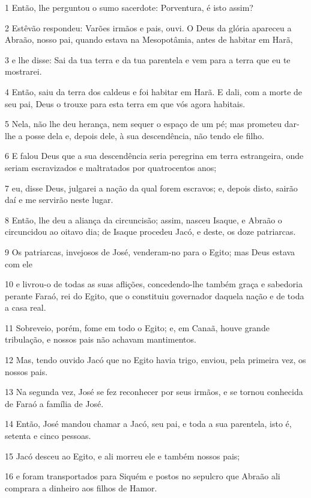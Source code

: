 \par 1 Então, lhe perguntou o sumo sacerdote: Porventura, é isto assim?
\par 2 Estêvão respondeu: Varões irmãos e pais, ouvi. O Deus da glória apareceu a Abraão, nosso pai, quando estava na Mesopotâmia, antes de habitar em Harã,
\par 3 e lhe disse: Sai da tua terra e da tua parentela e vem para a terra que eu te mostrarei.
\par 4 Então, saiu da terra dos caldeus e foi habitar em Harã. E dali, com a morte de seu pai, Deus o trouxe para esta terra em que vós agora habitais.
\par 5 Nela, não lhe deu herança, nem sequer o espaço de um pé; mas prometeu dar-lhe a posse dela e, depois dele, à sua descendência, não tendo ele filho.
\par 6 E falou Deus que a sua descendência seria peregrina em terra estrangeira, onde seriam escravizados e maltratados por quatrocentos anos;
\par 7 eu, disse Deus, julgarei a nação da qual forem escravos; e, depois disto, sairão daí e me servirão neste lugar.
\par 8 Então, lhe deu a aliança da circuncisão; assim, nasceu Isaque, e Abraão o circuncidou ao oitavo dia; de Isaque procedeu Jacó, e deste, os doze patriarcas.
\par 9 Os patriarcas, invejosos de José, venderam-no para o Egito; mas Deus estava com ele
\par 10 e livrou-o de todas as suas aflições, concedendo-lhe também graça e sabedoria perante Faraó, rei do Egito, que o constituiu governador daquela nação e de toda a casa real.
\par 11 Sobreveio, porém, fome em todo o Egito; e, em Canaã, houve grande tribulação, e nossos pais não achavam mantimentos.
\par 12 Mas, tendo ouvido Jacó que no Egito havia trigo, enviou, pela primeira vez, os nossos pais.
\par 13 Na segunda vez, José se fez reconhecer por seus irmãos, e se tornou conhecida de Faraó a família de José.
\par 14 Então, José mandou chamar a Jacó, seu pai, e toda a sua parentela, isto é, setenta e cinco pessoas.
\par 15 Jacó desceu ao Egito, e ali morreu ele e também nossos pais;
\par 16 e foram transportados para Siquém e postos no sepulcro que Abraão ali comprara a dinheiro aos filhos de Hamor.
